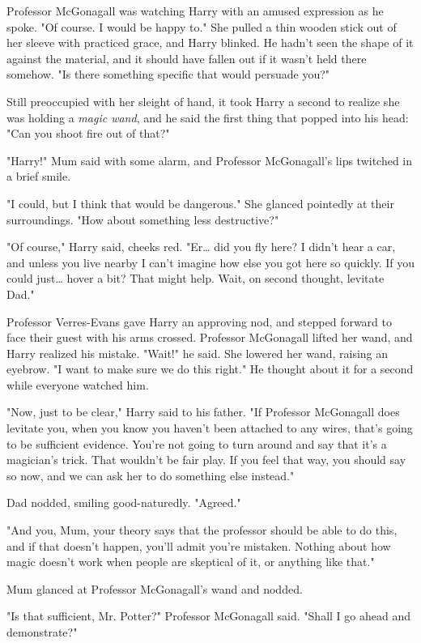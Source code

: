 Professor McGonagall was watching Harry with an amused
expression as he spoke. "Of course. I would be happy to."
She pulled a thin wooden stick out of her sleeve with
practiced grace, and Harry blinked. He hadn't seen the
shape of it against the material, and it should have fallen
out if it wasn't held there somehow. "Is there something
specific that would persuade you?"

Still preoccupied with her sleight of hand, it took Harry a
second to realize she was holding a \emph{magic wand}, and he
said the first thing that popped into his head: "Can you
shoot fire out of that?"

"Harry!" Mum said with some alarm, and Professor
McGonagall's lips twitched in a brief smile.

"I could, but I think that would be dangerous." She
glanced pointedly at their surroundings. "How about
something less destructive?"

"Of course," Harry said, cheeks red. "Er{\ldots} did you fly
here? I didn't hear a car, and unless you live nearby I
can't imagine how else you got here so quickly. If you
could just{\ldots} hover a bit? That might help. Wait, on second
thought, levitate Dad."

Professor Verres-Evans gave Harry an approving nod, and
stepped forward to face their guest with his arms crossed.
Professor McGonagall lifted her wand, and Harry realized
his mistake. "Wait!" he said. She lowered her wand, raising
an eyebrow. "I want to make sure we do this right." He
thought about it for a second while everyone watched him.

"Now, just to be clear," Harry said to his father. "If Professor
McGonagall does levitate you, when you know you haven't
been attached to any wires, that's going to be sufficient
evidence. You're not going to turn around and say that it's
a magician's trick. That wouldn't be fair play. If you feel
that way, you should say so now, and we can ask her to
do something else instead."

Dad nodded, smiling good-naturedly. "Agreed."

"And you, Mum, your theory says that the professor
should be able to do this, and if that doesn't happen,
you'll admit you're mistaken. Nothing about how magic
doesn't work when people are skeptical of it, or anything
like that."

Mum glanced at Professor McGonagall's wand and nodded.

"Is that sufficient, Mr. Potter?" Professor McGonagall said.
"Shall I go ahead and demonstrate?"

